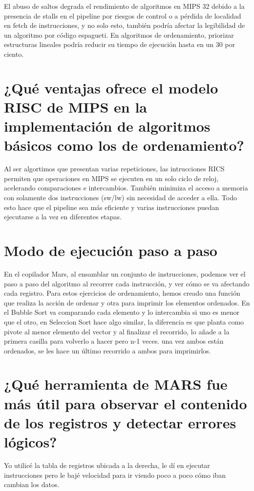 \documentclass{article}
\begin{document}
El abuso de saltos degrada el rendimiento de algoritmos en MIPS 32 debido a la presencia de stalls en el pipeline por riesgos de control o a pérdida de localidad en fetch de instrucciones, y no solo esto, también podría afectar la legibilidad de un algoritmo por código espagueti. En algoritmos de ordenamiento, priorizar estructuras lineales podría reducir su tiempo de ejecución hasta en un 30 por ciento.

\section*{¿Qué ventajas ofrece el modelo RISC de MIPS en la implementación de algoritmos
básicos como los de ordenamiento?}

Al ser algortimos que presentan varias repeticiones, las intrucciones RICS permiten que operaciones en MIPS se ejecuten en un solo ciclo de reloj, acelerando comparaciones e intercambios. También minimiza el acceso a memoria con solamente dos instrucciones (sw/lw) sin necesidad de acceder a ella. Todo esto hace que el pipeline sea más eficiente y varias instrucciones puedan ejecutarse a la vez en diferentes etapas.

\section*{Modo de ejecución paso a paso}
En el copilador Mars, al ensamblar un conjunto de instrucciones, podemos ver el paso a paso del algoritmo al recorrer cada instrucción, y ver cómo se va afectando cada registro. Para estos ejercicios de ordenamiento, hemos creado una función que realiza la acción de ordenar y otra para imprimir los elementos ordenados. En el Bubble Sort va comparando cada elemento y lo intercambia si uno es menor que el otro, en Seleccion Sort hace algo similar, la diferencia es que planta como pivote al menor elemento del vector y al finalizar el recorrido, lo añade a la primera casilla para volverlo a hacer pero n-1 veces. una vez ambos están ordenados, se les hace un último recorrido a ambos para imprimirlos.

\section*{¿Qué herramienta de MARS fue más útil para observar el contenido de los registros y
detectar errores lógicos?}

Yo utilicé la tabla de registros ubicada a la derecha, le dí en ejecutar instrucciones pero le bajé velocidad para ir viendo poco a poco cómo iban cambian los datos.
\end{document}
